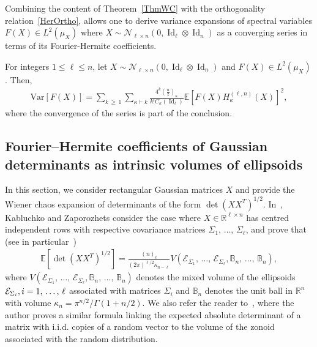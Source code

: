 \documentclass[AHL,Unicode,longabstracts,published]{cedram}
\DeclareMathOperator{\Id}{Id}
\newcommand{\scN}{\mathscr{N}}
\newcommand{\clE}{\mathcal{E}}
\newcommand{\R}{\mathbb{R}}
\newcommand{\bbB}{\mathbb{B}}
\newcommand{\E}[1]{\mathbb{E}\left[#1\right]}
\newcommand{\V}[1]{\mathrm{Var}{\left[#1\right]}}
\begin{document}
Combining the content of Theorem~\ref{ThmWC} with the orthogonality relation~\eqref{HerOrtho}, allows one to derive variance expansions of spectral variables $F(X)\in L^2(\mu_X)$ where $X \sim \scN_{\ell \times n}(0,\Id_{\ell}\otimes \Id_n)$ as a converging series in terms of its Fourier-Hermite coefficients.

\begin{prop}\label{VarEx}
For integers $1\leq \ell \leq n$, let $X \sim \scN_{\ell \times n}(0,\Id_{\ell}\otimes \Id_n)$ and $F(X) \in L^2(\mu_X)$. Then,
\begin{gather*}
\V{F(X)}=\sum_{k\,\geq\,1}\sum_{\kappa \vdash k}
\frac{4^{k}(\frac{n}{2})_{\kappa}}{k!C_{\kappa}(\Id_{\ell}) }
\E{F(X) H_{\kappa}^{(\ell,n)}(X)}^2,
\end{gather*}
where the convergence of the series is part of the conclusion.
\end{prop}



\subsection{Fourier--Hermite coefficients of Gaussian determinants as intrinsic volumes of ellipsoids}\label{SectGeom}
In this section, we consider rectangular Gaussian matrices $X$ and provide the Wiener chaos expansion of determinants of the form $\det(XX^T)^{1/2}$. In~\cite{Kab14}, Kablu\-chko and Zaporozhets consider the case where $X\in \R^{\ell\times n}$ has centred independent rows with respective covariance matrices $\Sigma_1,\,\ldots,\,\Sigma_{\ell}$, and prove that (see in particular~\cite[Theorem~1.1]{Kab14})
\begin{gather}\label{Kab11}
\E{\det\left(XX^T\right)^{1/2}} = \frac{(n)_{\ell}}{(2\pi)^{\ell/2}\kappa_{n-\ell}}V\left(\clE_{\Sigma_1},\,\ldots,\,\clE_{\Sigma_{\ell}},\bbB_n,\,\ldots,\,\bbB_n\right),
\end{gather}
where $V(\clE_{\Sigma_1},\,\ldots,\,\clE_{\Sigma_{\ell}},\bbB_n,\,\ldots,\,\bbB_n)$ denotes the mixed volume of the ellipsoids $\clE_{\Sigma_i}, i\linebreak =1,\,\ldots,\,\ell$ associated with matrices $\Sigma_i$ and $\bbB_n$ denotes the unit ball in $\R^n$ with volume $\kappa_n= \pi^{n/2}/\Gamma(1+n/2)$. We also refer the reader to~\cite[Theorem~3.2]{Vit:91}, where the author proves a similar formula linking the expected absolute determinant of a matrix with i.i.d. copies of a random vector to the volume of the zonoid associated with the random distribution.
\end{document}
